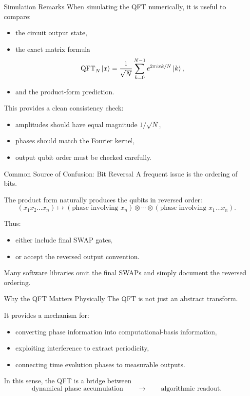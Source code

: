 \documentclass{beamer}
\begin{document}
\begin{frame}{Simulation Remarks}
When simulating the QFT numerically, it is useful to compare:
\begin{itemize}
\item the circuit output state,
\item the exact matrix formula
\[
\operatorname{QFT}_N\ket{x}
=
\frac{1}{\sqrt N}\sum_{k=0}^{N-1} e^{2\pi i xk/N}\ket{k},
\]
\item and the product-form prediction.
\end{itemize}

This provides a clean consistency check:
\begin{itemize}
\item amplitudes should have equal magnitude \(1/\sqrt N\),
\item phases should match the Fourier kernel,
\item output qubit order must be checked carefully.
\end{itemize}
\end{frame}

\begin{frame}{Common Source of Confusion: Bit Reversal}
A frequent issue is the ordering of bits.

The product form naturally produces the qubits in reversed order:
\[
(x_1x_2\dots x_n)\mapsto
(\text{phase involving }x_n)\otimes \cdots \otimes (\text{phase involving }x_1\dots x_n).
\]

Thus:
\begin{itemize}
\item either include final SWAP gates,
\item or accept the reversed output convention.
\end{itemize}

Many software libraries omit the final SWAPs and simply document the reversed ordering.
\end{frame}

\begin{frame}{Why the QFT Matters Physically}
The QFT is not just an abstract transform.

It provides a mechanism for:
\begin{itemize}
\item converting phase information into computational-basis information,
\item exploiting interference to extract periodicity,
\item connecting time evolution phases to measurable outputs.
\end{itemize}

In this sense, the QFT is a bridge between
\[
\text{dynamical phase accumulation}
\qquad\longrightarrow\qquad
\text{algorithmic readout}.
\]
\end{frame}
\end{document}
